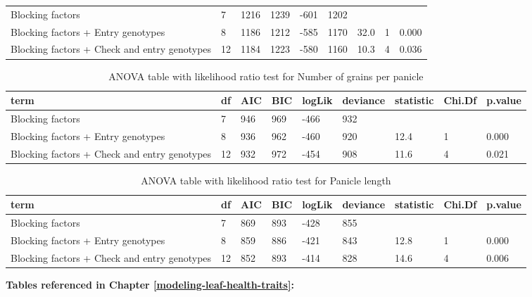 \documentclass[12pt,oneside]{dukestatscithesis} %
\theoremstyle{definition}
\theoremstyle{definition}
\theoremstyle{definition}
\theoremstyle{remark}
\begin{document}
\begin{table}[H]
\begin{tabular}[t]{>{\raggedright\arraybackslash}p{3.5cm}llllllll}
\midrule
Blocking factors & 7 & 1216 & 1239 & -601 & 1202 &  &  & \\
Blocking factors + Entry genotypes & 8 & 1186 & 1212 & -585 & 1170 & 32.0 & 1 & 0.000\\
Blocking factors + Check and entry genotypes & 12 & 1184 & 1223 & -580 & 1160 & 10.3 & 4 & 0.036\\
\bottomrule
\end{tabular}
\end{table}\begin{table}[H]
\caption{\label{tab:unnamed-chunk-3}\label{tab:lrt-gperpan}ANOVA table with likelihood ratio test for Number of grains per panicle}
\centering
\begin{tabular}[t]{>{\raggedright\arraybackslash}p{3.5cm}llllllll}
\toprule
term & df & AIC & BIC & logLik & deviance & statistic & Chi.Df & p.value\\
\midrule
Blocking factors & 7 & 946 & 969 & -466 & 932 &  &  & \\
Blocking factors + Entry genotypes & 8 & 936 & 962 & -460 & 920 & 12.4 & 1 & 0.000\\
Blocking factors + Check and entry genotypes & 12 & 932 & 972 & -454 & 908 & 11.6 & 4 & 0.021\\
\bottomrule
\end{tabular}
\end{table}\begin{table}[H]
\caption{\label{tab:unnamed-chunk-3}\label{tab:lrt-panlen}ANOVA table with likelihood ratio test for Panicle length}
\centering
\begin{tabular}[t]{>{\raggedright\arraybackslash}p{3.5cm}llllllll}
\toprule
term & df & AIC & BIC & logLik & deviance & statistic & Chi.Df & p.value\\
\midrule
Blocking factors & 7 & 869 & 893 & -428 & 855 &  &  & \\
Blocking factors + Entry genotypes & 8 & 859 & 886 & -421 & 843 & 12.8 & 1 & 0.000\\
Blocking factors + Check and entry genotypes & 12 & 852 & 893 & -414 & 828 & 14.6 & 4 & 0.006\\
\bottomrule
\end{tabular}
\end{table}
\textbf{Tables referenced in Chapter \ref{modeling-leaf-health-traits}:}
\end{document}
